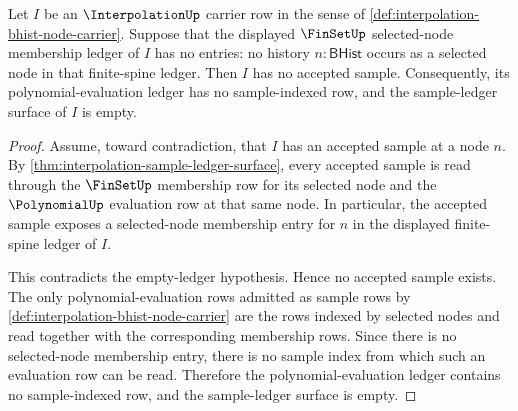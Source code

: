 \begin{closurestatus}{\InterpolationUp}
  \theoryclosure{\publicClosure}
  \formalstatus{\axiomCleanV}
\end{closurestatus}

\begin{theorem}
\label{thm:interpolation-empty-selection-empty-evaluation-ledger}
Let $I$ be an $\InterpolationUp$ carrier row in the sense of
\autoref{def:interpolation-bhist-node-carrier}. Suppose that the displayed
$\FinSetUp$ selected-node membership ledger of $I$ has no entries: no history
$n:\mathsf{BHist}$ occurs as a selected node in that finite-spine ledger. Then
$I$ has no accepted sample. Consequently, its polynomial-evaluation ledger has
no sample-indexed row, and the sample-ledger surface of $I$ is empty.
\end{theorem}
\begin{proof}
Assume, toward contradiction, that $I$ has an accepted sample at a node $n$.
By \autoref{thm:interpolation-sample-ledger-surface}, every accepted sample is
read through the $\FinSetUp$ membership row for its selected node and the
$\PolynomialUp$ evaluation row at that same node. In particular, the accepted
sample exposes a selected-node membership entry for $n$ in the displayed
finite-spine ledger of $I$.

This contradicts the empty-ledger hypothesis. Hence no accepted sample exists.
The only polynomial-evaluation rows admitted as sample rows by
\autoref{def:interpolation-bhist-node-carrier} are the rows indexed by selected
nodes and read together with the corresponding membership rows. Since there is
no selected-node membership entry, there is no sample index from which such an
evaluation row can be read. Therefore the polynomial-evaluation ledger contains
no sample-indexed row, and the sample-ledger surface is empty.
\end{proof}
